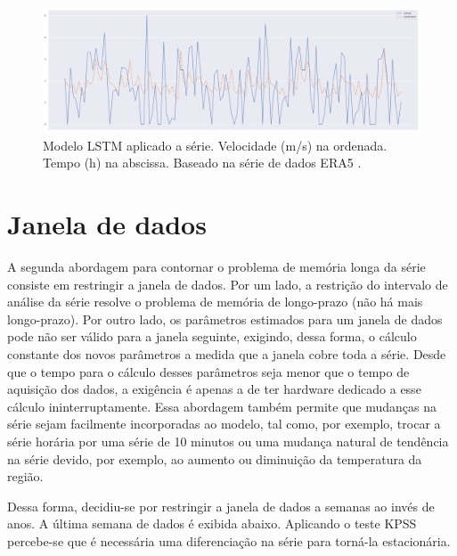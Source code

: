 \documentclass[
	12pt,				%
	openright,			%
	oneside,			%
	a4paper,			%
	english,			%
	french,				%
	spanish,			%
	brazil				%
	]{abntex2}
\begin{document}
\begin{figure}[h]
    \centering
	\includegraphics[width=\textwidth]{lstm.png}
	\caption{Modelo LSTM aplicado a série. Velocidade (m/s) na ordenada. Tempo (h) na abscissa. Baseado na série de dados ERA5 \cite{era5}.}
\end{figure}
\FloatBarrier 

\section{Janela de dados}\label{janela}

A segunda abordagem para contornar o problema de memória longa da série consiste em restringir a janela de dados. Por um lado, a restrição do intervalo de análise da série resolve o problema de memória de longo-prazo (não há mais longo-prazo). Por outro lado, os parâmetros estimados para um janela de dados pode não ser válido para a janela seguinte, exigindo, dessa forma, o cálculo constante dos novos parâmetros a medida que a janela cobre toda a série. Desde que o tempo para o cálculo desses parâmetros seja menor que o tempo de aquisição dos dados, a exigência é apenas a de ter hardware dedicado a esse cálculo ininterruptamente. Essa abordagem também permite que mudanças na série sejam facilmente incorporadas ao modelo, tal como, por exemplo, trocar a série horária por uma série de 10 minutos ou uma mudança natural de tendência na série devido, por exemplo, ao aumento ou diminuição da temperatura da região.

Dessa forma, decidiu-se por restringir a janela de dados a semanas ao invés de anos. A última semana de dados é exibida abaixo. Aplicando o teste KPSS percebe-se que é necessária uma diferenciação na série para torná-la estacionária.
\end{document}
